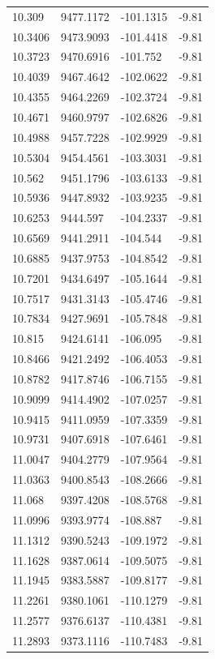 \begin{table}[H]
\begin{tabular}{llll}
10.309 & 9477.1172 & -101.1315 & -9.81 \\
10.3406 & 9473.9093 & -101.4418 & -9.81 \\
10.3723 & 9470.6916 & -101.752 & -9.81 \\
10.4039 & 9467.4642 & -102.0622 & -9.81 \\
10.4355 & 9464.2269 & -102.3724 & -9.81 \\
10.4671 & 9460.9797 & -102.6826 & -9.81 \\
10.4988 & 9457.7228 & -102.9929 & -9.81 \\
10.5304 & 9454.4561 & -103.3031 & -9.81 \\
10.562 & 9451.1796 & -103.6133 & -9.81 \\
10.5936 & 9447.8932 & -103.9235 & -9.81 \\
10.6253 & 9444.597 & -104.2337 & -9.81 \\
10.6569 & 9441.2911 & -104.544 & -9.81 \\
10.6885 & 9437.9753 & -104.8542 & -9.81 \\
10.7201 & 9434.6497 & -105.1644 & -9.81 \\
10.7517 & 9431.3143 & -105.4746 & -9.81 \\
10.7834 & 9427.9691 & -105.7848 & -9.81 \\
10.815 & 9424.6141 & -106.095 & -9.81 \\
10.8466 & 9421.2492 & -106.4053 & -9.81 \\
10.8782 & 9417.8746 & -106.7155 & -9.81 \\
10.9099 & 9414.4902 & -107.0257 & -9.81 \\
10.9415 & 9411.0959 & -107.3359 & -9.81 \\
10.9731 & 9407.6918 & -107.6461 & -9.81 \\
11.0047 & 9404.2779 & -107.9564 & -9.81 \\
11.0363 & 9400.8543 & -108.2666 & -9.81 \\
11.068 & 9397.4208 & -108.5768 & -9.81 \\
11.0996 & 9393.9774 & -108.887 & -9.81 \\
11.1312 & 9390.5243 & -109.1972 & -9.81 \\
11.1628 & 9387.0614 & -109.5075 & -9.81 \\
11.1945 & 9383.5887 & -109.8177 & -9.81 \\
11.2261 & 9380.1061 & -110.1279 & -9.81 \\
11.2577 & 9376.6137 & -110.4381 & -9.81 \\
11.2893 & 9373.1116 & -110.7483 & -9.81 \\

\end{tabular}
\end{table}
